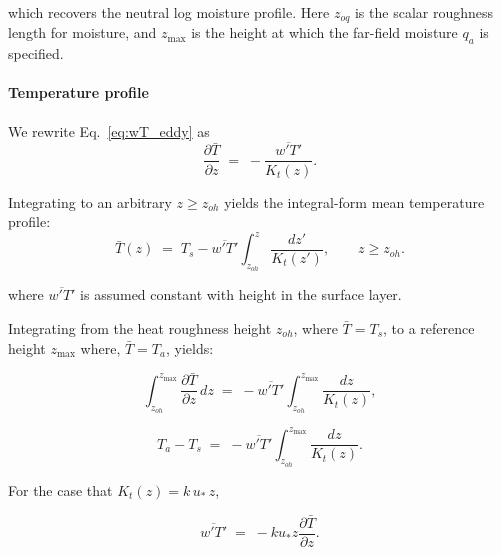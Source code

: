 \documentclass{article}
\begin{document}
    which recovers the  neutral log moisture profile. Here $z_{oq}$ is the scalar roughness length for moisture, and $z_{\max}$ is the height at which the far-field moisture $q_a$ is specified.

    
    
    \paragraph{Temperature profile}

     We rewrite Eq.~\eqref{eq:wT_eddy} as
    \begin{equation}
    \frac{\partial \bar T}{\partial z}
    \;=\;
    -\frac{\overline{w'T'}}{K_t(z)}.
    \end{equation}

    
    Integrating to an arbitrary  $z\ge z_{oh}$ yields the integral-form mean temperature profile:
    \begin{equation}
    \bar T(z)
    \;=\;
    T_s
    -\overline{w'T'}\int_{z_{oh}}^{z}\frac{dz'}{K_t(z')},
    \qquad z\ge z_{oh}.
    \label{eq:T_profile_general}
    \end{equation}

    where $\overline{w'T'}$ is assumed constant with height in the surface layer. 


    Integrating from the heat roughness height $z_{oh}$, where $\bar T=T_s$, to a reference height $z_{\max}$ where, $\bar T=T_a$, yields: 

    \begin{equation}
    \int_{z_{oh}}^{z_{\max}}\frac{\partial \bar T}{\partial z}\,dz
    \;=\;
    -\overline{w'T'}\int_{z_{oh}}^{z_{\max}}\frac{dz}{K_t(z)},
    \end{equation}

    \begin{equation}
    T_a - T_s
    \;=\;
    -\overline{w'T'}\int_{z_{oh}}^{z_{\max}}\frac{dz}{K_t(z)}.
    \label{eq:Ta_minus_Ts_general}
    \end{equation}

    For the case that $K_t(z)=k\,u_*\,z$, 

    \begin{equation}
    \overline{w'T'} \;=\; -k u_* z\frac{\partial \bar T}{\partial z}.
    \label{eq:wT_eddy}
    \end{equation}
\end{document}
